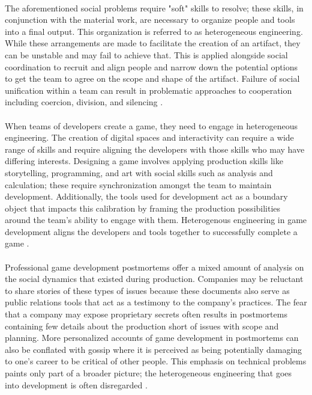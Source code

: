 \paragraph{} The aforementioned social problems require "soft" skills to resolve; these skills, in conjunction with the material work, are necessary to organize people and tools into a final output. This organization is referred to as heterogeneous engineering. While these arrangements are made to facilitate the creation of an artifact, they can be unstable and may fail to achieve that. This is applied alongside social coordination to recruit and align people and narrow down the potential options to get the team to agree on the scope and shape of the artifact. Failure of social unification within a team can result in problematic approaches to cooperation including coercion, division, and silencing \autocite{law_technology_1987}. 

\paragraph{} When teams of developers create a game, they need to engage in heterogeneous engineering. The creation of digital spaces and interactivity can require a wide range of skills and require aligning the developers with those skills who may have differing interests. Designing a game involves applying production skills like storytelling, programming, and art with social skills such as analysis and calculation; these require synchronization amongst the team to maintain development. Additionally, the tools used for development act as a boundary object that impacts this calibration by framing the production possibilities around the team's ability to engage with them. Heterogenous engineering in game development aligns the developers and tools together to successfully complete a game \autocite{whitson_what_2020}.

\paragraph{} Professional game development postmortems offer a mixed amount of analysis on the social dynamics that existed during production. Companies may be reluctant to share stories of these types of issues because these documents also serve as public relations tools that act as a testimony to the company's practices. The fear that a company may expose proprietary secrets often results in postmortems containing few details about the production short of issues with scope and planning. More personalized accounts of game development in postmortems can also be conflated with gossip where it is perceived as being potentially damaging to one's career to be critical of other people. This emphasis on technical problems paints only part of a broader picture; the heterogeneous engineering that goes into development is often disregarded \autocite{odonnell_everyday_2009}.

